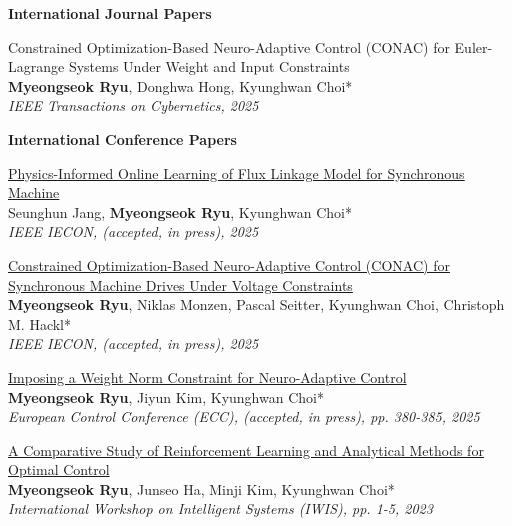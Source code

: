 
\textbf{International Journal Papers}

\small{\begin{etaremune}

    \item {
        Constrained Optimization-Based Neuro-Adaptive Control (CONAC) for Euler-Lagrange Systems Under Weight and Input Constraints
        \\
        \textbf{Myeongseok Ryu}, Donghwa Hong, Kyunghwan Choi*
        \\
        \textit{
            IEEE Transactions on Cybernetics, 2025
        }
    }

\end{etaremune}}
    
\textbf{International Conference Papers}

\small{\begin{etaremune}

    \item {
        \href{https://doi.org/10.36227/techrxiv.172893538.89561848/v1}{Physics-Informed Online Learning of Flux Linkage Model for Synchronous Machine}
        \\
        Seunghun Jang, \textbf{Myeongseok Ryu}, Kyunghwan Choi*
        \\
        \textit{
            IEEE IECON, (accepted, in press), 2025
        }
    }

    \item {
        \href{https://doi.org/10.36227/techrxiv.174585949.94234666/v1}{Constrained Optimization-Based Neuro-Adaptive Control (CONAC) for Synchronous Machine Drives Under Voltage Constraints}
        \\
        \textbf{Myeongseok Ryu}, Niklas Monzen, Pascal Seitter, Kyunghwan Choi, Christoph M. Hackl*
        \\
        \textit{
            IEEE IECON, (accepted, in press), 2025
        }
    }

    \item {
        \href{https://doi.org/10.36227/techrxiv.173014412.26480551/v1}{Imposing a Weight Norm Constraint for Neuro-Adaptive Control}
        \\
        \textbf{Myeongseok Ryu}, Jiyun Kim, Kyunghwan Choi*
        \\
        \textit{
            European Control Conference (ECC), (accepted, in press), pp. 380-385, 2025
        }
    }

    \item {
        \href{https://doi.org/10.1109/IWIS58789.2023.10284677}{A Comparative Study of Reinforcement Learning and Analytical Methods for Optimal Control}
        \\
        \textbf{Myeongseok Ryu}, Junseo Ha, Minji Kim, Kyunghwan Choi*
        \\
        \textit{
            International Workshop on Intelligent Systems (IWIS), pp. 1-5, 2023
        }
    }

\end{etaremune}}
    
